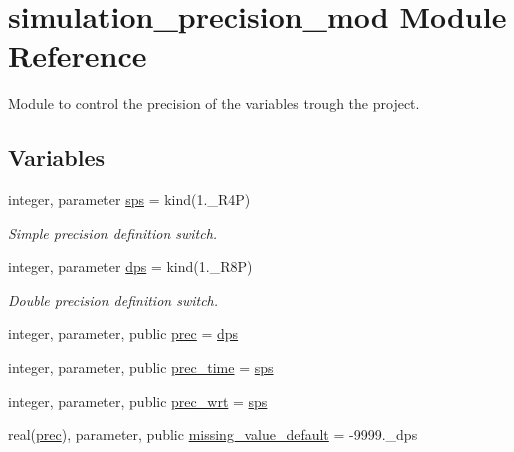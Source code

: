 \hypertarget{namespacesimulation__precision__mod}{}\section{simulation\+\_\+precision\+\_\+mod Module Reference}
\label{namespacesimulation__precision__mod}


Module to control the precision of the variables trough the project.  


\subsection*{Variables}
\begin{DoxyCompactItemize}
\item 
integer, parameter \mbox{\hyperlink{namespacesimulation__precision__mod_aa9eb32e6c7ef6d6f0b9c7df435105e88}{sps}} = kind(1.\+\_\+\+R4P)
\begin{DoxyCompactList}\small\item\em Simple precision definition switch. \end{DoxyCompactList}\item 
integer, parameter \mbox{\hyperlink{namespacesimulation__precision__mod_afa656a8f79bdee9d705fb5988ae40123}{dps}} = kind(1.\+\_\+\+R8P)
\begin{DoxyCompactList}\small\item\em Double precision definition switch. \end{DoxyCompactList}\item 
integer, parameter, public \mbox{\hyperlink{namespacesimulation__precision__mod_aaff1ddf996761a1e11e787d63e1612f6}{prec}} = \mbox{\hyperlink{namespacesimulation__precision__mod_afa656a8f79bdee9d705fb5988ae40123}{dps}}
\item 
integer, parameter, public \mbox{\hyperlink{namespacesimulation__precision__mod_a3833ad1bc52c3738ac861591b7492737}{prec\+\_\+time}} = \mbox{\hyperlink{namespacesimulation__precision__mod_aa9eb32e6c7ef6d6f0b9c7df435105e88}{sps}}
\item 
integer, parameter, public \mbox{\hyperlink{namespacesimulation__precision__mod_ad515822198607dfee68a6ed8b246c7da}{prec\+\_\+wrt}} = \mbox{\hyperlink{namespacesimulation__precision__mod_aa9eb32e6c7ef6d6f0b9c7df435105e88}{sps}}
\item 
real(\mbox{\hyperlink{namespacesimulation__precision__mod_aaff1ddf996761a1e11e787d63e1612f6}{prec}}), parameter, public \mbox{\hyperlink{namespacesimulation__precision__mod_a1fb0f91226452bb43d4c61cae32a9a6d}{missing\+\_\+value\+\_\+default}} = -\/9999.\+\_\+dps

\end{DoxyCompactItemize}
